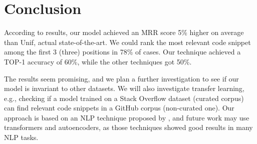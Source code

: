 \documentclass[sigconf]{acmart}
\begin{document}
\section{Conclusion}

According to results, our model achieved an MRR score 5\% higher on average than Unif, actual state-of-the-art. We could rank the most relevant code snippet among the first 3 (three) positions in 78\% of cases. Our technique achieved a TOP-1 accuracy of 60\%, while the other techniques got 50\%. 

The results seem promising, and we plan a further investigation to see if our model is invariant to other datasets. We will also investigate transfer learning, e.g., checking if a model trained on a Stack Overflow dataset (curated corpus) can find relevant code snippets in a GitHub corpus (non-curated one). Our approach is based on an NLP technique proposed by \citet{feng-2015}, and future work may use transformers and autoencoders, as those techniques showed good results in many NLP tasks. 




\end{document}
